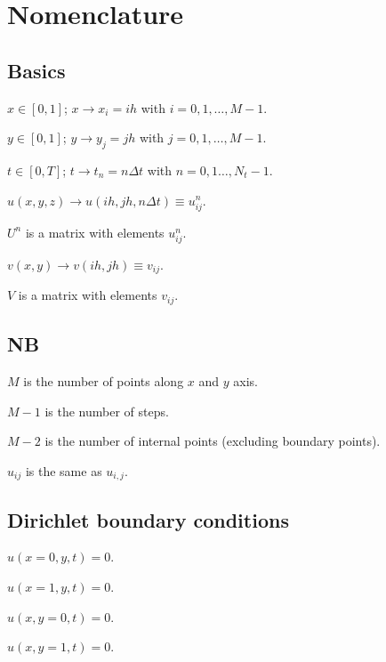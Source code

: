 \section*{Nomenclature}

    \subsection*{Basics}
        \begin{itemize*}
            \item[] $x\in[0,1]$; $x\to x_i = ih$ with $i=0,1,\dots,M-1$. \\
            \item[] $y\in[0,1]$; $y\to y_j = jh$ with $j=0,1,\dots,M-1$. \\
            \item[] $t\in[0,T]$; $t\to t_n=n\Delta t$ with $n=0,1\dots,N_t-1$.\\
            \item[] $u(x,y,z) \to u(ih,jh, n\Delta t) \equiv u^n_{ij}$.\\
            \item[] $U^n$ is a matrix with elements $u^n_{ij}$.\\
            \item[] $v(x,y) \to v(ih,jh) \equiv v_{ij}$.\\
            \item[] $V$ is a matrix with elements $v_{ij}$.
        \end{itemize*}

    \subsection*{NB}
        \begin{itemize*}
            \item[] $M$ is the number of points along $x$ and $y$ axis.\\
            \item[] $M-1$ is the number of steps.\\
            \item[] $M-2$ is the number of internal points (excluding boundary points).\\
            \item[] $u_{ij}$ is the same as $u_{i,j}$.
        \end{itemize*}

    \subsection*{Dirichlet boundary conditions}
        \begin{itemize*}
            \item[] $u(x=0, y, t) = 0$. \\
            \item[] $u(x=1, y, t) = 0$. \\
            \item[] $u(x, y=0, t) = 0$. \\
            \item[] $u(x, y=1, t) = 0$.
        \end{itemize*}